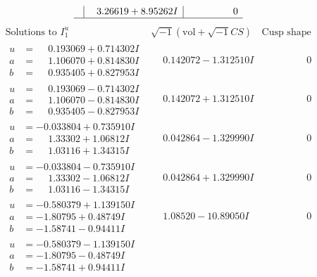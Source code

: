 \documentclass[1p]{elsarticle_modified}
\theoremstyle{definition}
\newcommand{\I}{\sqrt{-1}}
\begin{document}
$$\begin{array}{c|c|c}
 & \phantom{-}3.26619 + 8.95262 I & \phantom{-0.000000 } 0\\
 \hline 
 \end{array}$$\newpage$$\begin{array}{c|c|c}  
\text{Solutions to }I^u_{1}& \I (\text{vol} + \sqrt{-1}CS) & \text{Cusp shape}\\
 \hline 
\begin{aligned}
u &= \phantom{-}0.193069 + 0.714302 I \\
a &= \phantom{-}1.106070 + 0.814830 I \\
b &= \phantom{-}0.935405 + 0.827953 I\end{aligned}
 & \phantom{-}0.142072 - 1.312510 I & \phantom{-0.000000 } 0 \\ \hline\begin{aligned}
u &= \phantom{-}0.193069 - 0.714302 I \\
a &= \phantom{-}1.106070 - 0.814830 I \\
b &= \phantom{-}0.935405 - 0.827953 I\end{aligned}
 & \phantom{-}0.142072 + 1.312510 I & \phantom{-0.000000 } 0 \\ \hline\begin{aligned}
u &= -0.033804 + 0.735910 I \\
a &= \phantom{-}1.33302 + 1.06812 I \\
b &= \phantom{-}1.03116 + 1.34315 I\end{aligned}
 & \phantom{-}0.042864 - 1.329990 I & \phantom{-0.000000 } 0 \\ \hline\begin{aligned}
u &= -0.033804 - 0.735910 I \\
a &= \phantom{-}1.33302 - 1.06812 I \\
b &= \phantom{-}1.03116 - 1.34315 I\end{aligned}
 & \phantom{-}0.042864 + 1.329990 I & \phantom{-0.000000 } 0 \\ \hline\begin{aligned}
u &= -0.580379 + 1.139150 I \\
a &= -1.80795 + 0.48749 I \\
b &= -1.58741 - 0.94411 I\end{aligned}
 & \phantom{-}1.08520 - 10.89050 I & \phantom{-0.000000 } 0 \\ \hline\begin{aligned}
u &= -0.580379 - 1.139150 I \\
a &= -1.80795 - 0.48749 I \\
b &= -1.58741 + 0.94411 I\end{aligned}

\end{array}$$
\end{document}
